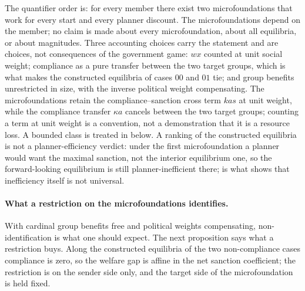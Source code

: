 The quantifier order is: for every member there exist two microfoundations that
work for every start and every planner discount. The microfoundations depend on
the member; no claim is made about every microfoundation, about all equilibria, or
about magnitudes. Three accounting choices carry the statement and are choices,
not consequences of the government game: $wx$ counted at unit social weight;
compliance as a pure transfer between the two target groups, which is what
makes the constructed equilibria of cases $00$ and $01$ tie; and group benefits unrestricted in size, with
the inverse political weight compensating. The microfoundations retain the
compliance--sanction cross term $kas$ at unit weight, while the compliance transfer $\kappa a$
cancels between the two target groups; counting a term at unit weight is a
convention, not a demonstration that it is a resource loss. A bounded class
is treated in  below. A ranking
of the constructed equilibria is not a planner-efficiency verdict: under the first microfoundation a
planner would want the maximal sanction, not the interior equilibrium one, so
the forward-looking equilibrium is still planner-inefficient there;
 is what shows that inefficiency itself
is not universal.

\paragraph{What a restriction on the microfoundations identifies.}
With cardinal group benefits free and political weights compensating,
non-identification is what one should expect. The next proposition says what a
restriction buys. Along the constructed equilibria of the two non-compliance cases compliance is zero, so the
welfare gap is affine in the net sanction coefficient; the restriction is on the
sender side only, and the target side of the microfoundation is held fixed.

